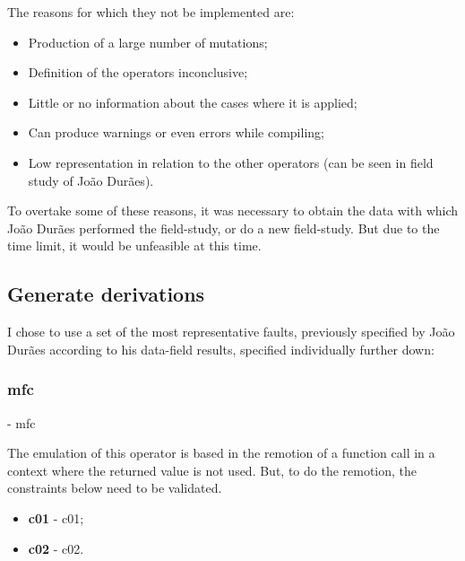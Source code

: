 The reasons for which they not be implemented are:

\begin{itemize}
	\item Production of a large number of mutations;
	\item Definition of the operators inconclusive;
	\item Little or no information about the cases where it is applied;
	\item Can produce warnings or even errors while compiling;
	\item Low representation in relation to the other operators (can be seen in field study of João Durães).
\end{itemize}

To overtake some of these reasons, it was necessary to obtain the data with which João Durães performed the field-study, or do a new field-study. But due to the time limit, it would be unfeasible at this time.


\clearpage
\subsection{Generate derivations}

I chose to use a set of the most representative faults, previously specified by João Durães\cite{duraes2006emulation} according to his data-field results, specified individually further down:

	\subsubsection{\textbf{\acs{mfc}}} - \Acl{mfc}
	\hypertarget{mfc}{}

	The emulation of this operator is based in the remotion of a function call in a context where the returned value is not used. But, to do the remotion, the constraints below need to be validated.
	\begin{itemize}
		\item \textbf{\acs{c01}} - \Acl{c01};
		\item \textbf{\acs{c02}} - \Acl{c02}.
	\end{itemize}

